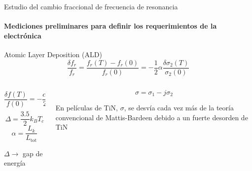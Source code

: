 \documentclass[ignorenonframetext,12pt]{beamer}
\begin{document}
%
\begin{frame}{Estudio del cambio fraccional de frecuencia de resonancia}
				\framesubtitle{Mediciones preliminares para definir los requerimientos
				de la electrónica}
				Atomic Layer Deposition (ALD)
												\begin{equation*}
																\frac{\delta f_r}{f_r} = \frac{f_r(T) -
																f_r(0)}{f_r(0)} = -\frac{1}{2}\alpha\frac{\delta
																\sigma_2(T)}{\sigma_2(0)}
												\end{equation*}
				\begin{columns}
								\begin{column}{0.49\textwidth}
												{\color{blue}\begin{equation*}
								\frac{\delta f(T)}{f(0)} = 
																-\frac{\alpha}{2}\sqrt{\frac{\pi \Delta}{2 k_B
																T}} e^{-\frac{\Delta}{k_B T}}
												\end{equation*}}
				\begin{equation*}
								\Delta = \frac{3.5}{2} k_B T_c
				\end{equation*}
				\begin{equation*}
								\alpha = \frac{L_k}{L_\text{tot}}
				\end{equation*}

												$\Delta \to$ gap de energía
								\end{column}
				\begin{column}{0.49\textwidth}
				\begin{equation*}
								\sigma = \sigma_1 - j \sigma_2
				\end{equation*}

								En películas de TiN, $\sigma$, se desvía cada vez más de la
								teoría convencional	de Mattis-Bardeen debido a un \alert{fuerte
								desorden de TiN}
								\end{column}
								\end{columns}
\end{frame}
\end{document}
